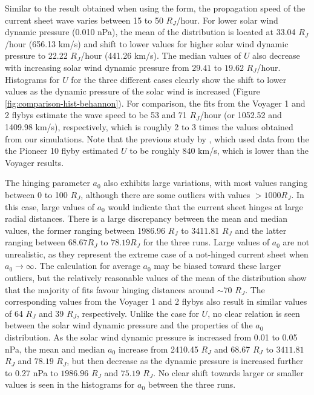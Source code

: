Similar to the result obtained when using the  form, the propagation speed of the current sheet wave varies between 15 to 50 $R_J$/hour. For lower solar wind dynamic pressure (0.010 nPa), the mean of the distribution is located at 33.04 $R_J$/hour (656.13 km/s) and shift to lower values for higher solar wind dynamic pressure to 22.22 $R_J$/hour (441.26 km/s). The median values of $U$ also decrease with increasing solar wind dynamic pressure from $29.41$ to $19.62$ $R_J$/hour. Histograms for $U$ for the three different cases clearly show the shift to lower values as the dynamic pressure of the solar wind is increased (Figure \ref{fig:comparison-hist-behannon}). For comparison, the fits from the Voyager 1 and 2 flybys estimate the wave speed to be 53 and 71 $R_J$/hour (or 1052.52 and 1409.98 km/s), respectively, which is roughly 2 to 3 times the values obtained from our simulations. Note that the previous study by , which used data from the the Pioneer 10 flyby estimated $U$ to be roughly 840 km/s, which is lower than the Voyager results. 

The hinging parameter $a_0$ also exhibits large variations, with most values ranging between 0 to 100 $R_J$, although there are some outliers with values $>1000 R_J$. In this case, large values of $a_0$ would indicate that the current sheet hinges at large radial distances. There is a large discrepancy between the mean and median values, the former ranging between 1986.96 $R_J$ to 3411.81 $R_J$ and the latter ranging between $68.67 R_J$ to $78.19 R_J$ for the three runs. Large values of $a_0$ are not unrealistic, as they represent the extreme case of a not-hinged current sheet when $a_0\rightarrow\infty$.  The calculation for average $a_0$ may be biased toward these larger outliers, but the relatively reasonable values of the mean of the distribution show that the majority of fits favour hinging distances around $\sim70$ $R_J$. The corresponding values from the Voyager 1 and 2 flybys also result in similar values of 64 $R_J$ and 39 $R_J$, respectively. Unlike the case for $U$, no clear relation is seen between the solar wind dynamic pressure and the properties of the $a_0$ distribution. As the solar wind dynamic pressure is increased from 0.01 to 0.05 nPa, the mean and median $a_0$ increase from 2410.45 $R_J$ and 68.67 $R_J$ to $3411.81$ $R_J$ and $78.19$ $R_J$, but then decrease as the dynamic pressure is increased further to 0.27 nPa to $1986.96$ $R_J$ and $75.19$ $R_J$. No clear shift towards larger or smaller values  is seen in the histograms for $a_0$ between the three runs.
 
